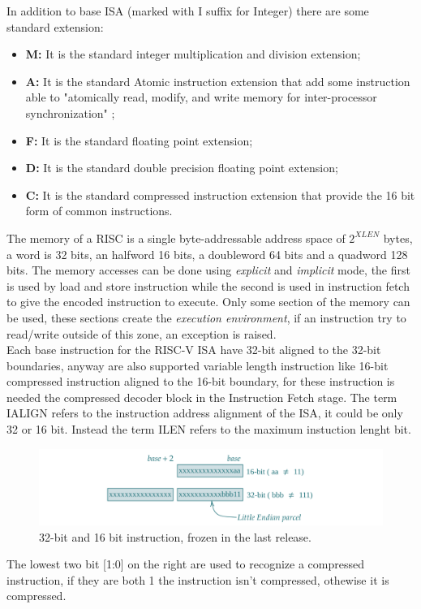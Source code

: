 {{	    
	    In addition to base ISA (marked with I suffix for Integer) there are some standard extension:
	    \begin{itemize}
	        \item \textbf{M:} It is the standard integer multiplication and division extension;
	        \item \textbf{A:} It is the standard Atomic instruction extension that add some instruction able to "atomically read, modify, and write memory  for  inter-processor  synchronization" ;
	        \item \textbf{F:} It is the standard floating point extension;
	        \item \textbf{D:} It is the standard double precision floating point extension;
	        \item \textbf{C:} It is the standard compressed instruction extension that provide the 16 bit form of common instructions.
	   \end{itemize}
	   

	   The memory of a RISC is a single byte-addressable address space of $2^{XLEN}$ bytes, a word is 32 bits, an halfword 16 bits, a doubleword 64 bits and a quadword 128 bits. 
	   The memory accesses can be done using \textit{explicit} and \textit{implicit} mode, the first is used by load and store instruction while the second is used in instruction fetch to give the encoded instruction to execute.
	   Only some section of the memory can be used, these sections create the \textit{execution environment}, if an instruction try to read/write outside of this zone, an exception is raised.\\
	   
	   Each base instruction for the RISC-V ISA have 32-bit aligned to the 32-bit boundaries, anyway are also supported variable length instruction like 16-bit compressed instruction aligned to the 16-bit boundary, for these instruction is needed the compressed decoder block in the Instruction Fetch stage.
	   The term IALIGN refers to the instruction address alignment of the ISA, it could be only 32 or 16 bit. Instead the term ILEN refers to the maximum instuction lenght bit.\\
	    \begin{figure}[H]
			\centering
			\includegraphics[scale=0.18,center]{./images/RISCVinstruction.png}
			\caption{32-bit and 16 bit instruction, frozen in the last release.}
			\label{fig:riscvinstruction}
		\end{figure}  
		The lowest two bit [1:0] on the right are used to recognize a compressed instruction, if they are both 1 the instruction isn't compressed, othewise it is compressed.
		
}}
